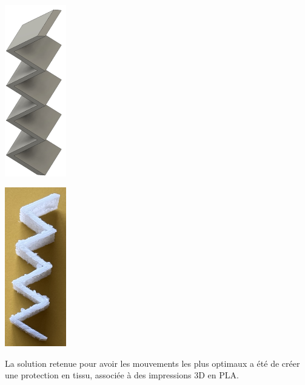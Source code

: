 \begin{minipage}[c]{0.48\textwidth}
    \begin{center}
        \includegraphics[width=0.2\textwidth]{assets/figures/Protections_laser/Securite_mecanique/Protection_vers_microscope/zigzag_model.jpeg}
    \end{center}
    \label{zigzag_model}
\end{minipage}\hfill
\begin{minipage}[c]{0.48\textwidth}
    \begin{center}
        \includegraphics[width=0.2\textwidth]{assets/figures/Protections_laser/Securite_mecanique/Protection_vers_microscope/zigzag_reel.jpeg}
    \end{center}
    \label{zigzag_reel}
\end{minipage}

La solution retenue pour avoir les mouvements les plus optimaux a été de créer une protection en tissu, associée à des impressions 3D en PLA.
\newpage

